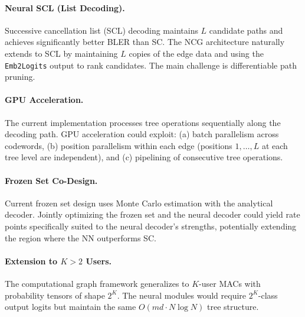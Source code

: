 \documentclass[11pt,a4paper]{article}
\begin{document}
\paragraph{Neural SCL (List Decoding).} Successive cancellation list (SCL) decoding maintains $L$ candidate paths and achieves significantly better BLER than SC. The NCG architecture naturally extends to SCL by maintaining $L$ copies of the edge data and using the \texttt{Emb2Logits} output to rank candidates. The main challenge is differentiable path pruning.

\paragraph{GPU Acceleration.} The current implementation processes tree operations sequentially along the decoding path. GPU acceleration could exploit: (a) batch parallelism across codewords, (b) position parallelism within each edge (positions $1, \ldots, L$ at each tree level are independent), and (c) pipelining of consecutive tree operations.

\paragraph{Frozen Set Co-Design.} Current frozen set design uses Monte Carlo estimation with the analytical decoder. Jointly optimizing the frozen set and the neural decoder could yield rate points specifically suited to the neural decoder's strengths, potentially extending the region where the NN outperforms SC.

\paragraph{Extension to $K > 2$ Users.} The computational graph framework generalizes to $K$-user MACs with probability tensors of shape $2^K$. The neural modules would require $2^K$-class output logits but maintain the same $O(md \cdot N \log N)$ tree structure.
\end{document}
